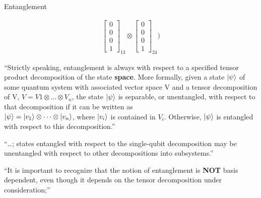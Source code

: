 \documentclass{beamer}
\begin{document}
\begin{frame}{Entanglement}
{\begin{align*}
                                  \begin{bmatrix} 0 \\ 0 \\ 0 \\ 1 \end{bmatrix}_{13} \otimes  \begin{bmatrix} 0 \\ 0 \\ 0 \\ 1 \end{bmatrix}_{24} )
    \end{align*}

    “Strictly speaking, entanglement is always with respect to a specified tensor product decomposition of the state \textbf{space}.
    More formally, given a state $\ket\psi$ of some quantum system with associated vector space V and a tensor decomposition of V, $V = V1 \otimes \dots \otimes V_n$,
    the state $\ket\psi$ is separable, or unentangled, with respect to that decomposition if it can be written as \\
    $\ket\psi = \ket{v_1} \otimes \dots \otimes \ket{v_n} $, where $\ket{v_i}$ is contained in $V_i$. Otherwise, $\ket\psi$ is entangled with respect to this decomposition.”
    \par
    “\dots; states entangled with respect to the single-qubit decomposition may be unentangled with respect to other decompositions into subsystems.”
    \par
    “It is important to recognize that the notion of entanglement is \textbf{NOT} basis dependent, even though it depends on the tensor decomposition under consideration;”
  }%
\end{frame}
\end{document}
